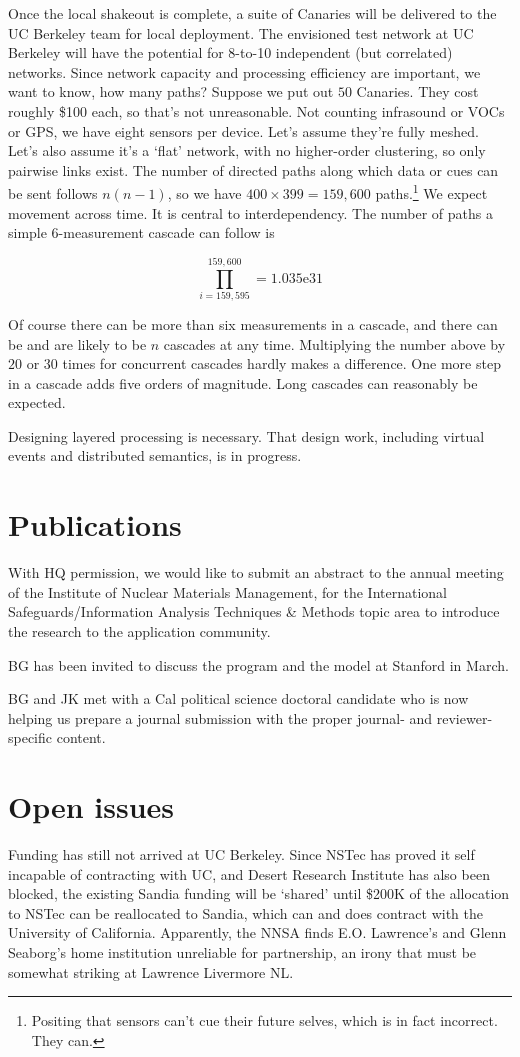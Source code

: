 \documentclass[11pt]{article} %
\begin{document}
Once the local shakeout is complete, a suite of Canaries will be delivered to the UC Berkeley team for local deployment. The envisioned test network at UC Berkeley will have the potential for 8-to-10 independent (but correlated) networks. Since network capacity and processing efficiency are important, we want to know, how many paths? Suppose we put out $50$ Canaries. They cost roughly \$100 each, so that's not unreasonable. Not counting  infrasound or VOCs or GPS, we have eight sensors per device. Let's assume they're fully meshed. Let's also assume it's a `flat' network, with no higher-order clustering, so only pairwise links  exist. The number of directed paths along which data or cues can be sent follows $n(n-1)$, so we have  $400 \times 399 = 159,600$ paths.\footnote{Positing that sensors can't cue their future selves, which is in fact incorrect. They can.} We expect movement across time. It is central to interdependency. The number of paths a  simple 6-measurement cascade can follow is
\begin{center}
$$\prod_{i=159,595}^{159,600} = 1.035\mathrm{e}{31}$$
\end{center}Of course there can be more than six measurements in a cascade, and there can be and are likely to be $n$ cascades at any time. Multiplying the number above by $20$ or $30$ times for concurrent cascades hardly makes a difference. One more step in a cascade adds five orders of magnitude. Long cascades can reasonably be expected. 

Designing layered processing is necessary. That design work, including virtual events and distributed semantics, is in progress.

\section{Publications}
\noindent With HQ permission, we would like to submit an abstract to the annual meeting of the Institute of Nuclear Materials Management, for the International Safeguards/Information Analysis Techniques \& Methods topic area to introduce the research to the application community. 

BG has been invited to discuss the program and the model at Stanford in March.

BG and JK met with a Cal political science doctoral candidate who is now helping us prepare a journal submission with the proper journal- and reviewer-specific content.

\section{Open issues}
\noindent Funding has still not arrived at UC Berkeley. Since NSTec has proved it self incapable of contracting with UC, and Desert Research Institute has also been blocked, the existing Sandia funding will be `shared' until \$200K of the allocation to NSTec can be reallocated to Sandia, which can and does contract with the University of California. Apparently, the NNSA finds E.O. Lawrence's and Glenn Seaborg's home institution unreliable for partnership, an irony that must be somewhat striking at Lawrence Livermore NL. 
\end{document}
